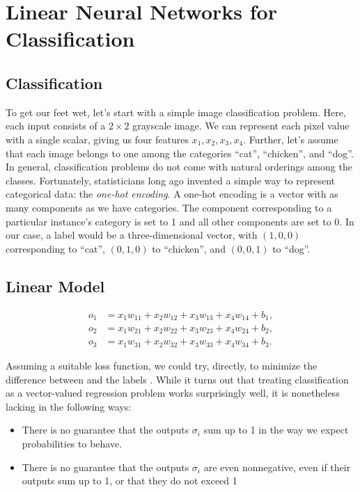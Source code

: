 \documentclass[a4paper,12pt]{article}
\theoremstyle{definition}
\begin{document}
\section{Linear Neural Networks for Classification}
    
    \subsection*{Classification}
    To get our feet wet, let’s start with a simple image classification problem. Here, each input consists of a $2\times2$
    grayscale image. We can represent each pixel value with a single scalar, giving us four features $x_1, x_2, x_3, x_4$. 
    Further, let’s assume that each image belongs to one among the categories “cat”, “chicken”, and “dog”. 
    \newline
    In general, classification problems do not come with natural orderings among the classes. Fortunately, statisticians long ago invented a 
    simple way to represent categorical data: the \emph{one-hot encoding}. A one-hot encoding is a vector with as many components as we have 
    categories. The component corresponding to a particular instance’s category is set to 1 and all other components are set to 0. In our case, 
    a label would be a three-dimensional vector, with $(1,0,0)$ corresponding to “cat”, $(0,1,0)$ to “chicken”, and $(0,0,1)$ to “dog”.
    \subsection*{Linear Model}
    \begin{equation*}
        \begin{aligned}
        o_1 &= x_1 w_{11} + x_2 w_{12} + x_3 w_{13} + x_4 w_{14} + b_1,\\
        o_2 &= x_1 w_{21} + x_2 w_{22} + x_3 w_{23} + x_4 w_{24} + b_2,\\
        o_3 &= x_1 w_{31} + x_2 w_{32} + x_3 w_{33} + x_4 w_{34} + b_3.
        \end{aligned}
    \end{equation*}


    Assuming a suitable loss function, we could try, directly, to minimize the difference between 
 and the labels 
. While it turns out that treating classification as a vector-valued regression problem works surprisingly well, it is nonetheless lacking in the following ways:
\begin{itemize}
    \item There is no guarantee that the outputs $\sigma_i$ sum up to 1 in the way we expect probabilities to behave.
    \item There is no guarantee that the outputs $\sigma_i$ are even nonnegative, even if their outputs sum up to 1, or that they do not exceed 1
\end{itemize}
\end{document}
